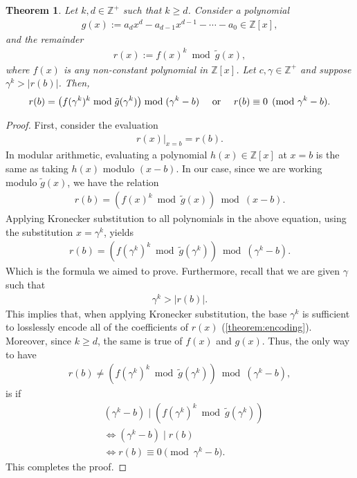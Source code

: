 \documentclass[12pt]{article}
\theoremstyle{plain}
\newtheorem{theorem}{Theorem}
\theoremstyle{definition}
\newcommand{\eval}[2]{\left . #1 \right|_{#2}}
\begin{document}
\begin{theorem} \label{theorem:kroneckerqrings}
Let $k, d \in \mathbb{Z}^+$ such that $k \geq d$. Consider a polynomial
\begin{align*}
g(x) := a_d x^d - a_{d-1} x^{d-1} - \cdots - a_0 \in \mathbb{Z}[x] ,
\end{align*}
and the remainder
\begin{align*}
r(x) := f(x)^k  \bmod{\tilde{g}(x)} ,
\end{align*}
where $f(x)$ is any non-constant polynomial in $\mathbb{Z}[x]$. Let $c, \gamma \in \mathbb{Z}^+$ and suppose $\gamma^k > |r(b)|$. Then,
\begin{align*}
r(b) = \left(f(\gamma^k)^k \bmod{\tilde{g}(\gamma^k)}\right) \bmod{(\gamma^k - b)}
\quad \textup{ or }
\quad r(b) \equiv 0 \pmod{\gamma^k - b} .
\end{align*}
\end{theorem}
\begin{proof}
First, consider the evaluation 
\begin{align*}
    \eval{r(x)}{x=b} = r(b) .
\end{align*}
In modular arithmetic, evaluating a polynomial $h(x) \in \mathbb{Z}[x]$ at $x=b$ is the same as taking $h(x)$ modulo $(x - b)$. In our case, since we are working modulo $\tilde{g}(x)$, we have the relation
\begin{align*}
    r(b) = \left(f(x)^k \bmod{\tilde{g}(x)}\right) \bmod{(x - b)} .
\end{align*}
Applying Kronecker substitution to all polynomials in the above equation, using the substitution $x = \gamma^k$, yields
\begin{align*}
    r(b) = \left(f(\gamma^k)^k \bmod{\tilde{g}(\gamma^k)}\right) \bmod{(\gamma^k - b)} .
\end{align*}
Which is the formula we aimed to prove. Furthermore, recall that we are given $\gamma$ such that
\begin{align*}
    \gamma^k > |r(b)| .
\end{align*}
This implies that, when applying Kronecker substitution, the base $\gamma^k$ is sufficient to losslessly encode all of the coefficients of $r(x)$ (\cref{theorem:encoding}). Moreover, since $k \geq d$, the same is true of $f(x)$ and $g(x)$. Thus, the only way to have
\begin{align*}
    r(b) \not= \left(f(\gamma^k)^k \bmod{\tilde{g}(\gamma^k)}\right) \bmod{(\gamma^k - b)} ,
\end{align*}
is if
\begin{align*}
    & (\gamma^k - b) \mid (f(\gamma^k)^k \bmod{\tilde{g}(\gamma^k)}) \\
    & \Longleftrightarrow (\gamma^k - b) \mid r(b) \\
    & \Longleftrightarrow r(b) \equiv 0 \pmod{\gamma^k - b} .
\end{align*}
This completes the proof.
\end{proof}
\end{document}
